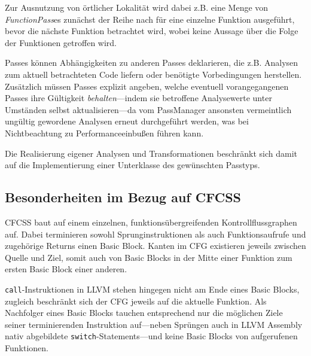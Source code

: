 Zur Ausnutzung von örtlicher Lokalität wird dabei z.B. eine Menge von
\emph{FunctionPass}es zunächst der Reihe nach für eine einzelne Funktion
ausgeführt, bevor die nächste Funktion betrachtet wird, wobei keine Aussage
über die Folge der Funktionen getroffen wird.

Passes können Abhängigkeiten zu anderen Passes deklarieren, die z.B. Analysen
zum aktuell betrachteten Code liefern oder benötigte Vorbedingungen herstellen.
Zusätzlich müssen Passes explizit angeben, welche eventuell vorangegangenen
Passes ihre Gültigkeit \emph{behalten}—indem sie betroffene Analysewerte unter
Umständen selbst aktualisieren—da vom PassManager ansonsten vermeintlich
ungültig gewordene Analysen erneut durchgeführt werden, was bei Nichtbeachtung
zu Performanceeinbußen führen kann.

Die Realisierung eigener Analysen und Transformationen beschränkt sich damit
auf die Implementierung einer Unterklasse des gewünschten
Passtyps.~\cite{writing-passes}

\subsection{Besonderheiten im Bezug auf CFCSS}

CFCSS baut auf einem einzelnen, funktionsübergreifenden Kontrollflussgraphen
auf. Dabei terminieren sowohl Sprunginstruktionen als auch Funktionsaufrufe und
zugehörige Returns einen Basic
Block. Kanten im CFG existieren jeweils zwischen Quelle und Ziel, somit auch
von Basic Blocks in der Mitte einer Funktion zum ersten Basic Block einer
anderen.

\texttt{call}-Instruktionen in LLVM stehen hingegen nicht am Ende eines Basic
Blocks, zugleich beschränkt sich der CFG jeweils auf die aktuelle Funktion. Als
Nachfolger eines Basic Blocks tauchen entsprechend nur die möglichen Ziele
seiner terminierenden Instruktion auf—neben Sprüngen auch in LLVM Assembly
nativ abgebildete \texttt{switch}-Statements—und keine Basic Blocks von
aufgerufenen Funktionen.
